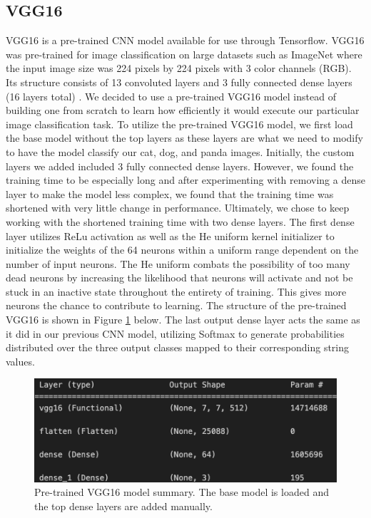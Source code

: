 \subsection{VGG16}
VGG16 is a pre-trained CNN model available for use through Tensorflow. 
VGG16 was pre-trained for image classification on large datasets such as ImageNet where the input image size was 224 pixels by 224 pixels with 3 color channels (RGB). 
Its structure consists of 13 convoluted layers and 3 fully connected dense layers (16 layers total) \cite{VGG16Explained}. 
We decided to use a pre-trained VGG16 model instead of building one from scratch to learn how efficiently it would execute our particular image classification task. 
To utilize the pre-trained VGG16 model, we first load the base model without the top layers as these layers are what we need to modify to have the model classify our cat, dog, and panda images. 
Initially, the custom layers we added included 3 fully connected dense layers.
However, we found the training time to be especially long and after experimenting with removing a dense layer to make the model less complex, we found that the training time was shortened with very little change in performance. 
Ultimately, we chose to keep working with the shortened training time with two dense layers. 
The first dense layer utilizes ReLu activation as well as the He uniform kernel initializer to initialize the weights of the 64 neurons within a uniform range dependent on the number of input neurons. 
The He uniform combats the possibility of too many dead neurons by increasing the likelihood that neurons will activate and not be stuck in an inactive state throughout the entirety of training. 
This gives more neurons the chance to contribute to learning. 
The structure of the pre-trained VGG16 is shown in Figure \ref{fig:figure5} below. 
The last output dense layer acts the same as it did in our previous CNN model, utilizing Softmax to generate probabilities distributed over the three output classes mapped to their corresponding string values. 

\begin{figure}[h]
	\centering
	\includegraphics[scale=0.5]{VGG16_structure}
	\caption{Pre-trained VGG16 model summary. The base model is loaded and the top dense layers are added manually.}
	\label{fig:figure5}
\end{figure}